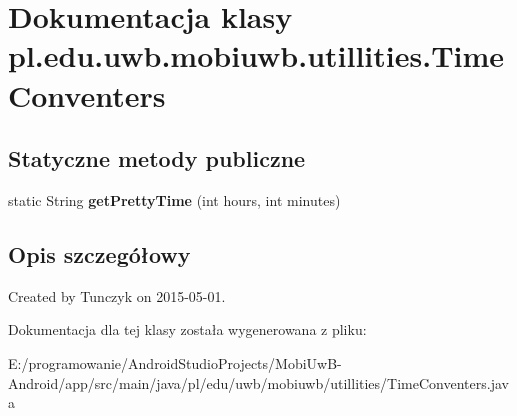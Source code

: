 \hypertarget{classpl_1_1edu_1_1uwb_1_1mobiuwb_1_1utillities_1_1_time_conventers}{}\section{Dokumentacja klasy pl.\+edu.\+uwb.\+mobiuwb.\+utillities.\+Time\+Conventers}
\label{classpl_1_1edu_1_1uwb_1_1mobiuwb_1_1utillities_1_1_time_conventers}
\subsection*{Statyczne metody publiczne}
\begin{DoxyCompactItemize}
\item 
\hypertarget{classpl_1_1edu_1_1uwb_1_1mobiuwb_1_1utillities_1_1_time_conventers_a09ea40bd060f59a6693b1fd24be28f55}{}static String {\bfseries get\+Pretty\+Time} (int hours, int minutes)\label{classpl_1_1edu_1_1uwb_1_1mobiuwb_1_1utillities_1_1_time_conventers_a09ea40bd060f59a6693b1fd24be28f55}

\end{DoxyCompactItemize}


\subsection{Opis szczegółowy}
Created by Tunczyk on 2015-\/05-\/01. 

Dokumentacja dla tej klasy została wygenerowana z pliku\+:\begin{DoxyCompactItemize}
\item 
E\+:/programowanie/\+Android\+Studio\+Projects/\+Mobi\+Uw\+B-\/\+Android/app/src/main/java/pl/edu/uwb/mobiuwb/utillities/Time\+Conventers.\+java\end{DoxyCompactItemize}
